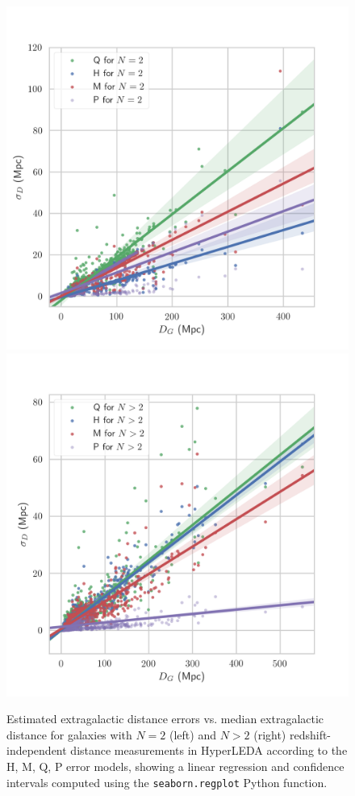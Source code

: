 \documentclass[a4paper,fleqn,usenatbib]{mnras}
\begin{document}
\begin{figure}
	\includegraphics[scale=0.69]{HLlow.png}
	\includegraphics[scale=0.69]{HLhigh.png}
    \caption{Estimated extragalactic distance errors vs. median extragalactic distance for galaxies with $N=2$ (left) and $N>2$ (right) redshift-independent distance measurements in HyperLEDA according to the H, M, Q, P error models, showing a linear regression and confidence intervals computed using the \texttt{seaborn.regplot} Python function.}
    \label{fig:HLlow}
\end{figure}
\end{document}
